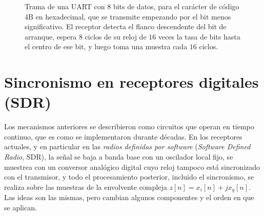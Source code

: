 \begin{figure}
    \begin{center}
    \end{center}
    \caption{Trama de una UART con $8$ bits de datos, para el carácter de código $\mathrm{4B}$ en hexadecimal, que se transmite empezando por el bit menos significativo. El receptor detecta el flanco descendente del bit de arranque, espera $8$ ciclos de su reloj de $16$ veces la tasa de bits hasta el centro de ese bit, y luego toma una muestra cada $16$ ciclos.}\label{fig:uart}
\end{figure}

\section{Sincronismo en receptores digitales (SDR)}\label{sec:sdr}

Los mecanismos anteriores se describieron como circuitos que operan en tiempo continuo, que es como se implementaron durante décadas. En los receptores actuales, y en particular en las \emph{radios definidas por software} (\emph{Software Defined Radio}, SDR), la señal se baja a banda base con un oscilador local fijo, se muestrea con un conversor analógico digital cuyo reloj tampoco está sincronizado con el transmisor, y todo el procesamiento posterior, incluido el sincronismo, se realiza sobre las muestras de la envolvente compleja $z[n]=x_i[n]+jx_q[n]$. Las ideas son las mismas, pero cambian algunos componentes y el orden en que se aplican.

